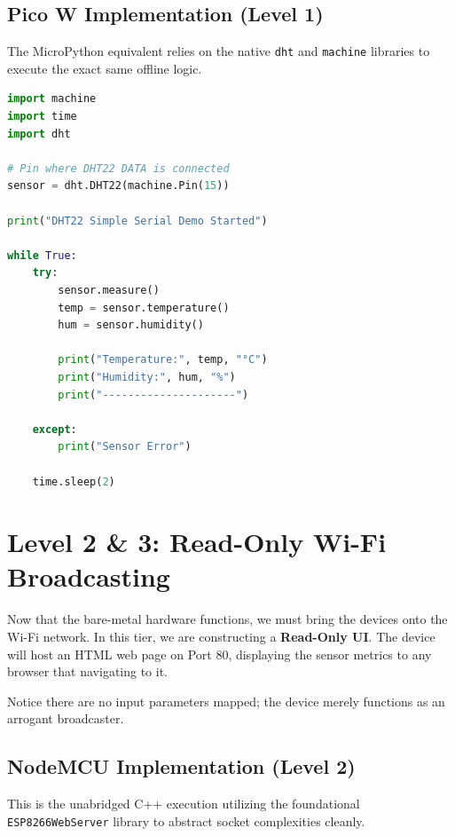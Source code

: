 \subsection{Pico W Implementation (Level 1)}
The MicroPython equivalent relies on the native \texttt{dht} and \texttt{machine} libraries to execute the exact same offline logic. 

\begin{lstlisting}[language=Python, caption=01\_offline\_mode.py]
import machine
import time
import dht

# Pin where DHT22 DATA is connected
sensor = dht.DHT22(machine.Pin(15))

print("DHT22 Simple Serial Demo Started")

while True:
    try:
        sensor.measure()
        temp = sensor.temperature()
        hum = sensor.humidity()

        print("Temperature:", temp, "°C")
        print("Humidity:", hum, "%")
        print("---------------------")

    except:
        print("Sensor Error")

    time.sleep(2)
\end{lstlisting}

\section{Level 2 \& 3: Read-Only Wi-Fi Broadcasting}
Now that the bare-metal hardware functions, we must bring the devices onto the Wi-Fi network. In this tier, we are constructing a \textbf{Read-Only UI}. The device will host an HTML web page on Port 80, displaying the sensor metrics to any browser that navigating to it. 

Notice there are no input parameters mapped; the device merely functions as an arrogant broadcaster. 

\subsection{NodeMCU Implementation (Level 2)}
This is the unabridged C++ execution utilizing the foundational \texttt{ESP8266WebServer} library to abstract socket complexities cleanly. 

